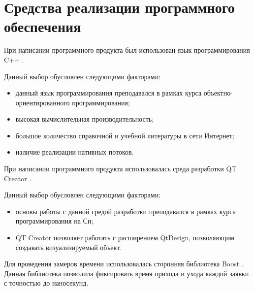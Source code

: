 \documentclass[12pt]{report}
\begin{document}
\section{Средства реализации программного обеспечения}
При написании программного продукта был использован язык программирования C++ \cite{Cpp}.

Данный выбор обусловлен следующими факторами:
\begin{itemize}
\item данный язык программирования преподавался в рамках курса объектно-ориентированного программирования;
\item высокая вычислительная производительность;
\item большое количество справочной и учебной литературы в сети Интернет;
\item наличие реализации нативных потоков.
\end{itemize}

При написании программного продукта использовалась среда разработки QT Creator \cite{QT}.

Данный выбор обусловлен следующими факторами:
\begin{itemize}
\item основы работы с данной средой разработки преподавался в рамках курса программирования на Си;
\item QT Creator позволяет работать с расширением QtDesign, позволяющим создавать визуализируемый объект.
\end{itemize}

Для проведения замеров времени использовалась сторонняя библиотека Boost \cite{Boost}. Данная библиотека позволила фиксировать время прихода и ухода каждой заявки с точностью до наносекунд.
\end{document}
